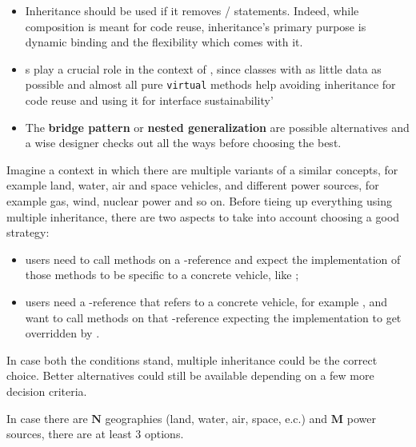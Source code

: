 \begin{itemize}
    \item Inheritance should be used if it removes 
    / statements. Indeed, while 
    composition is meant for code reuse, inheritance's primary purpose 
    is dynamic binding and the flexibility which comes with it.
    \item {}s play a crucial role in the context of 
    , since classes with as little 
    data as possible and almost all pure \texttt{virtual} methods help 
    avoiding inheritance for code reuse and using it for interface 
    sustainability' 
    \item The \textbf{bridge pattern} or \textbf{nested generalization} 
    are possible alternatives and a wise designer checks out all the 
    ways before choosing the best. 
\end{itemize}

\label{parag:mi-guideline-example}
Imagine a context in which there are multiple variants of a similar 
concepts, for example land, water, air and space vehicles, and different 
power sources, for example gas, wind, nuclear power and so on.
\newline
Before tieing up everything using multiple inheritance, there are two 
aspects to take into account choosing a good strategy:
\begin{itemize}
    \item users need to call methods on a -reference 
    and expect the implementation of those methods to be specific to 
    a concrete vehicle, like ;
    
    \item users need a -reference that refers to a 
    concrete vehicle, for example , and 
    want to call methods on that -reference 
    expecting the implementation to get overridden by 
    .
    
\end{itemize}
In case both the conditions stand, multiple inheritance could be the 
correct choice. Better alternatives could still be available depending 
on a few more decision criteria.

In case there are $\textbf{N}$ geographies (land, water, air, space, e.c.) 
and $\textbf{M}$ power sources, there are at least 3 options.


